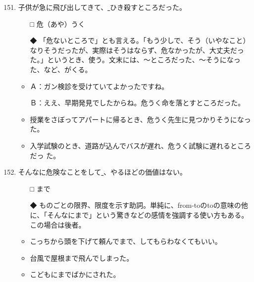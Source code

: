 \documentclass[
uplatex,
b5paper,
10pt,
dvipdfmx
]{jsbook}
\begin{document}
\begin{enumerate}
\setcounter{enumi}{150}

\item 子供が急に飛び出してきて、\underline{    }ひき殺すところだった。  
\begin{itemize}
\item[□] 危（あや）うく
\item[◆] 「危ないところで」とも言える。「もう少しで、そう（いやなこと）
	  なりそうだったが、実際はそうはならず、危なかったが、大丈夫だっ
	  た。」というとき、使う。文末には、〜ところだった、〜そうになっ
	  た、など、がくる。
\end{itemize}
\begin{itemize}
\item Ａ：ガン検診を受けていてよかったですね。

      Ｂ：ええ、早期発見でしたからね。危うく命を落とすところだった。

\item 授業をさぼってアパートに帰るとき、危うく先生に見つかりそうになった。
\item 入学試験のとき、道路が込んでバスが遅れ、危うく試験に遅れるところだっ
      た。
\end{itemize}

\item そんなに危険なことをして\underline{   }、やるほどの価値はない。
\begin{itemize}
\item[□] まで
\item[◆] ものごとの限界、限度を示す助詞。単純に、from-toのtoの意味の他
	  に、「そんなにまで」という驚きなどの感情を強調する使い方もある。
	  この場合は後者。
\end{itemize}
\begin{itemize}
\item こっちから頭を下げて頼んでまで、してもらわなくてもいい。
\item 台風で屋根まで飛んでしまった。
\item こどもにまでばかにされた。 
\end{itemize}


\end{enumerate}
\end{document}
